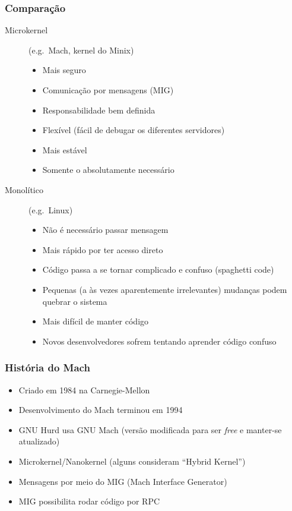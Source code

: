 \documentclass[10pt]{beamer}
\theoremstyle{plain}
\begin{document}
\begin{frame}
  \frametitle{Comparação}
  \begin{description}
    \item[Microkernel] (e.g.\ Mach, kernel do Minix)
      \begin{itemize}
        \item Mais seguro
        \item Comunicação por mensagens (MIG)
        \item Responsabilidade bem definida
        \item Flexível (fácil de debugar os diferentes servidores)
        \item Mais estável
        \item Somente o absolutamente necessário
      \end{itemize}
    \item[Monolítico] (e.g.\ Linux)
      \begin{itemize}
        \item Não é necessário passar mensagem
        \item Mais rápido por ter acesso direto
        \item Código passa a se tornar complicado e confuso (spaghetti code)
        \item Pequenas (a às vezes aparentemente irrelevantes) mudanças podem quebrar o sistema
        \item Mais difícil de manter código
        \item Novos desenvolvedores sofrem tentando aprender código confuso
      \end{itemize}
  \end{description}
\end{frame}

\begin{frame}
  \frametitle{História do Mach}
  \begin{itemize}
    \item Criado em 1984 na Carnegie-Mellon
    \item Desenvolvimento do Mach terminou em 1994
    \item GNU Hurd usa GNU Mach (versão modificada para ser \textit{free} e manter-se atualizado)
    \item Microkernel/Nanokernel (alguns consideram ``Hybrid Kernel'')
    \item Mensagens por meio do MIG (Mach Interface Generator)
    \item MIG possibilita rodar código por RPC
  \end{itemize}
\end{frame}
\end{document}
